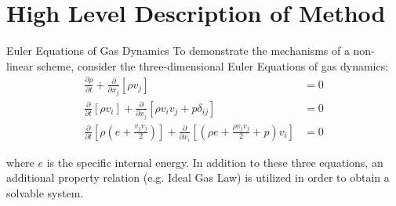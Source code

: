 \documentclass[9pt]{beamer}
\begin{document}



\section{High Level Description of Method}

\begin{frame}{Euler Equations of Gas Dynamics}
To demonstrate the mechanisms of a non-linear scheme, consider the three-dimensional Euler Equations of gas dynamics:
\begin{align}
\frac{\partial \rho}{\partial t}+\frac{\partial}{\partial x_j}[\rho v_j] &=0\label{eq:MassBalance}\\
\frac{\partial}{\partial t}[\rho v_i]+\frac{\partial}{\partial x_j}[\rho v_iv_j+p\delta_{ij}]&=0\label{eq:MomentaBalance}\\
\frac{\partial}{\partial t}[\rho(e+\tfrac{v_jv_j}{2})]+\frac{\partial}{\partial x_i}[(\rho e+\tfrac{\rho v_jv_j}{2} +p)v_i]&=0\label{eq:EnergyBalance}
\end{align}

where $e$ is the specific internal energy. In addition to these three equations, an additional property relation (e.g. Ideal Gas Law) is utilized in order to obtain a solvable system. 
\end{frame}
\end{document}
